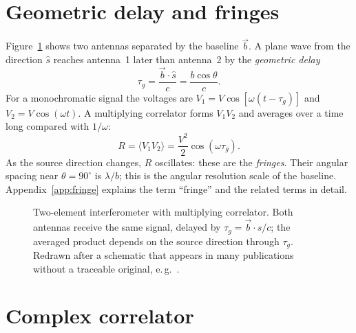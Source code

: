 
\section{Geometric delay and fringes}

Figure~\ref{fig:two-element} shows two antennas separated by the
baseline $\vec b$. A plane wave from the direction $\hat s$ reaches
antenna~1 later than antenna~2 by the \emph{geometric delay}
\begin{equation}
  \tau_g = \frac{\vec b\cdot\hat s}{c} = \frac{b\cos\theta}{c} .
  \label{eq:taug}
\end{equation}
For a monochromatic signal the voltages are
$V_1 = V\cos[\omega(t-\tau_g)]$ and $V_2 = V\cos(\omega t)$. A
multiplying correlator forms $V_1V_2$ and averages over a time long
compared with $1/\omega$:
\begin{equation}
  R = \langle V_1 V_2\rangle = \frac{V^2}{2}\cos(\omega\tau_g) .
  \label{eq:fringe}
\end{equation}
As the source direction changes, $R$ oscillates: these are the
\emph{fringes}. Their angular spacing near $\theta = 90^\circ$ is
$\lambda/b$; this is the angular resolution scale of the baseline.
Appendix~\ref{app:fringe} explains the term \enquote{fringe} and the
related terms in detail.

\begin{figure}[htbp]
  \centering
  
  \caption{Two-element interferometer with multiplying correlator. Both
           antennas receive the same signal, delayed by
           $\tau_g = \vec b\cdot\hat s/c$; the averaged product depends
           on the source direction through $\tau_g$. Redrawn after a
           schematic that appears in many publications without a
           traceable original, e.\,g.\ \cite{krinkele2012}.}
  \label{fig:two-element}
\end{figure}

\section{Complex correlator}

